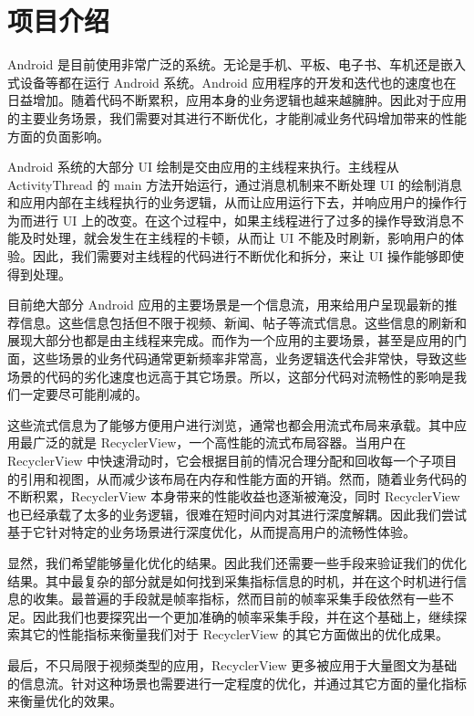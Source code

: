 \chapter{项目介绍}

Android 是目前使用非常广泛的系统\cite{businge2019studying}。无论是手机、平板、电子书、车机还是嵌入式设备等都在运行 Android 系统。Android 应用程序的开发和迭代也的速度也在日益增加。随着代码不断累积，应用本身的业务逻辑也越来越臃肿。因此对于应用的主要业务场景，我们需要对其进行不断优化，才能削减业务代码增加带来的性能方面的负面影响。

Android 系统的大部分 UI 绘制是交由应用的主线程来执行\cite{yan2014real}。主线程从 ActivityThread 的 main 方法开始运行，通过消息机制来不断处理 UI 的绘制消息和应用内部在主线程执行的业务逻辑，从而让应用运行下去，并响应用户的操作行为而进行 UI 上的改变。在这个过程中，如果主线程进行了过多的操作导致消息不能及时处理，就会发生在主线程的卡顿，从而让 UI 不能及时刷新，影响用户的体验。因此，我们需要对主线程的代码进行不断优化和拆分，来让 UI 操作能够即使得到处理。

目前绝大部分 Android 应用的主要场景是一个信息流，用来给用户呈现最新的推荐信息。这些信息包括但不限于视频、新闻、帖子等流式信息。这些信息的刷新和展现大部分也都是由主线程来完成。而作为一个应用的主要场景，甚至是应用的门面，这些场景的业务代码通常更新频率非常高，业务逻辑迭代会非常快，导致这些场景的代码的劣化速度也远高于其它场景。所以，这部分代码对流畅性的影响是我们一定要尽可能削减的。

这些流式信息为了能够方便用户进行浏览，通常也都会用流式布局来承载。其中应用最广泛的就是 RecyclerView，一个高性能的流式布局容器。\cite{sabiyath2020enhanced}当用户在 RecyclerView 中快速滑动时，它会根据目前的情况合理分配和回收每一个子项目的引用和视图，从而减少该布局在内存和性能方面的开销。然而，随着业务代码的不断积累，RecyclerView 本身带来的性能收益也逐渐被淹没，同时 RecyclerView 也已经承载了太多的业务逻辑，很难在短时间内对其进行深度解耦。因此我们尝试基于它针对特定的业务场景进行深度优化，从而提高用户的流畅性体验。

显然，我们希望能够量化优化的结果。因此我们还需要一些手段来验证我们的优化结果。其中最复杂的部分就是如何找到采集指标信息的时机，并在这个时机进行信息的收集。最普遍的手段就是帧率指标，然而目前的帧率采集手段依然有一些不足。因此我们也要探究出一个更加准确的帧率采集手段，并在这个基础上，继续探索其它的性能指标来衡量我们对于 RecyclerView 的其它方面做出的优化成果。

最后，不只局限于视频类型的应用，RecyclerView 更多被应用于大量图文为基础的信息流。针对这种场景也需要进行一定程度的优化，并通过其它方面的量化指标来衡量优化的效果。